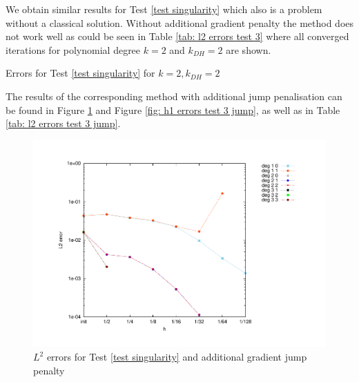 We obtain similar results for Test \ref{test singularity} which also is a problem without a classical solution. Without additional gradient penalty the method does not work well as could be seen in Table \ref{tab: l2 errors test 3} where all converged iterations for polynomial degree $k=2$ and $k_{DH}=2$ are shown.
\begin{table}[H]
		\centering
		\pgfplotstabletypeset[
		columns={iterations, l2error, h1error,N},
		    every row 0 column 0/.style={set content=init},
		]{\MAThreedegTwoTwo}
	\caption{Errors for Test \ref{test singularity} for $k=2, k_{DH}=2$}
	\label{tab: l2 errors test 3}
\end{table}

The results of the corresponding method with additional jump penalisation can be found in Figure \ref{fig: l2 errors test 3 jump} and Figure \ref{fig: h1 errors test 3 jump}, as well as in Table \ref{tab: l2 errors test 3 jump}. 

\begin{figure}[H]
	\centering
	\includegraphics[scale =0.45]{plots/MA3_Neilan_GradJump_l2.pdf}
	\caption{$L^2$ errors for Test \ref{test singularity} and additional gradient jump penalty}
	\label{fig: l2 errors test 3 jump}
\end{figure}

